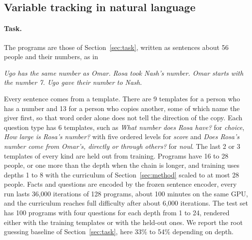 \documentclass{article}
\newcommand{\zr}{\textsc{z-reason}}
\begin{document}
\subsection{Variable tracking in natural language}
\label{sec:nlresults}

\paragraph{Task.} The programs are those of Section~\ref{sec:task}, written as sentences about 56 people and their numbers, as in
\begin{center}
\emph{Ugo has the same number as Omar. Rosa took Nash's number. Omar starts with the number 7. Ugo gave their number to Nash.}
\end{center}
Every sentence comes from a template. There are 9 templates for a person who has a number and 13 for a person who copies another, some of which name the giver first, so that word order alone does not tell the direction of the copy. Each question type has 6 templates, such as \emph{What number does Rosa have?} for \emph{choice}, \emph{How large is Rosa's number?} with five ordered levels for \emph{score} and \emph{Does Rosa's number come from Omar's, directly or through others?} for \emph{noul}. The last 2 or 3 templates of every kind are held out from training. Programs have 16 to 28 people, or one more than the depth when the chain is longer, and training uses depths 1 to 8 with the curriculum of Section~\ref{sec:method} scaled to at most 28 people. Facts and questions are encoded by the frozen sentence encoder, every run lasts 36{,}000 iterations of 128 programs, about 100 minutes on the same GPU, and the curriculum reaches full difficulty after about 6{,}000 iterations. The test set has 100 programs with four questions for each depth from 1 to 24, rendered either with the training templates or with the held-out ones. We report the root guessing baseline of Section~\ref{sec:task}, here 33\% to 54\% depending on depth.

\begin{table}[t]
\centering
\small
\caption{Natural-language variable tracking with the wording seen in training. Accuracy on \emph{choice} questions in percent by question depth, mean $\pm$ standard deviation over three seeds of \zr{} on frozen sentence vectors, the one-pass baseline with the same encoder, and the root guessing baseline. Training depth is at most 8 and $^\dagger$ marks depths never seen in training.}
\label{tab:nl}
\resizebox{\textwidth}{!}{}
\end{table}
\end{document}
